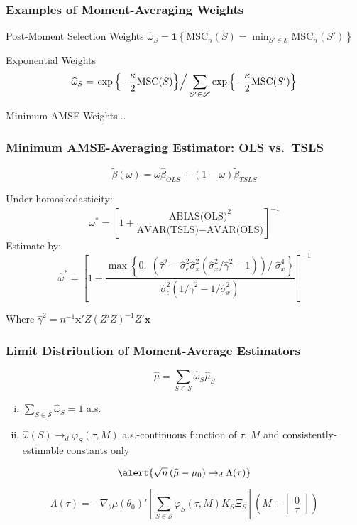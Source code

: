 \begin{frame}

	\frametitle{Examples of Moment-Averaging Weights}

	\begin{block}{Post-Moment Selection Weights}
		$\widehat{\omega}_S = \mathbf{1}\left\{\mbox{MSC}_n(S) = \min_{S'\in \mathscr{S}} \mbox{MSC}_n(S')\right\}$
	\end{block}
	\begin{block}
		{Exponential Weights}
		\[		\widehat{\omega}_S = \left.\exp\left\{-\frac{\kappa}{2} \mbox{MSC}(S)\right\}\right/\sum_{S' \in \mathscr{S}}\exp\left\{-\frac{\kappa}{2} \mbox{MSC}(S')\right\}\]
	\end{block}
	\begin{block}
		{Minimum-AMSE Weights...}
	\end{block}
\end{frame}


\begin{frame}
	\frametitle{Minimum AMSE-Averaging Estimator: OLS vs.\ TSLS}

\[\widetilde{\beta}(\omega) = \omega \widehat{\beta}_{OLS} + (1 - \omega) \widetilde{\beta}_{TSLS}\]

Under homoskedasticity:
\[\omega^* = \left[1 + \frac{\mbox{ABIAS(OLS)}^2}{\mbox{AVAR(TSLS)}-\mbox{AVAR(OLS)}} \right]^{-1}\]
Estimate by:
\[\widehat{\omega }^* = \left[1 + \frac{\max \left\{0, \; \left(\widehat{\tau}^2 - \widehat{\sigma}_\epsilon^2\widehat{\sigma}_x^2  \left(\widehat{\sigma}_x^2/\widehat{\gamma}^2 - 1 \right) \right)/\;\widehat{\sigma}_x^4 \right\}}{\widehat{\sigma}_\epsilon^2 (1/\widehat{\gamma}^2 - 1/\widehat{\sigma}_x^2)}\right]^{-1}\]

Where $\widehat{\gamma}^2 = n^{-1}\mathbf{x}'Z(Z'Z)^{-1}Z'\mathbf{x}$
\end{frame}

\begin{frame}
	\frametitle{Limit Distribution of Moment-Average Estimators}
	$$\widehat{\mu}=\sum_{S \in \mathscr{S}} \widehat{\omega}_S \widehat{\mu}_S$$
\begin{enumerate}[(i)]
	\item $\sum_{S \in \mathscr{S}} \widehat{\omega}_S = 1$ a.s. 
	\item $\widehat{\omega}(S) \rightarrow_d \varphi_S(\tau,M)$ a.s.-continuous function of $\tau$, $M$ and consistently-estimable constants only
\end{enumerate}

$$\alert{\sqrt{n}\left(\widehat{\mu} -  \mu_0\right) \rightarrow_d\Lambda(\tau)}$$

$$\Lambda(\tau) =  -\nabla_\theta\mu(\theta_0)'\left[\sum_{S \in \mathscr{S}} \varphi_S(\tau,M) K_S \Xi_S\right] \left(M +  \left[\begin{array}
	{c} 0 \\ \tau
\end{array} \right]\right)$$ 

\end{frame}


